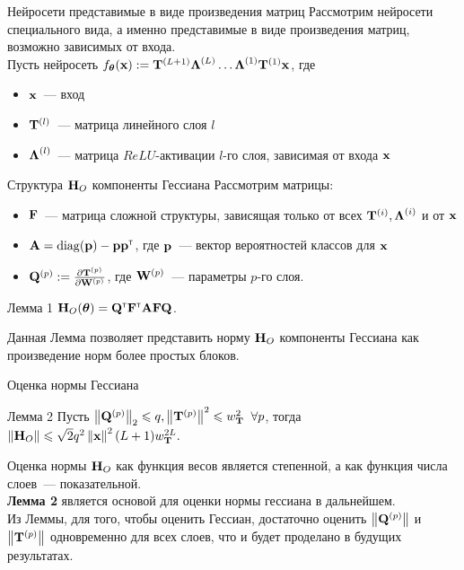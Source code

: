 \documentclass[aspectratio=169]{beamer}
\begin{document}
\begin{frame}{Нейросети представимые в виде произведения матриц}
Рассмотрим нейросети специального вида, а именно представимые в виде произведения матриц, возможно зависимых от входа. \\
        Пусть нейросеть $f_{\boldsymbol{\theta}}(\mathbf{x}) := \mathbf{T}^{(L+1)}\boldsymbol{\Lambda}^{(L)}\dots \boldsymbol{\Lambda}^{(1)}\mathbf{T}^{(1)}\mathbf{x}$, где 
        \vspace{-0.5em}
        \begin{itemize}
        \item $\mathbf{x}$~--- вход \item $\mathbf{T}^{(l)}$~--- матрица линейного слоя $l$
        \item $\boldsymbol{\Lambda}^{(l)}$~--- матрица $ReLU$-активации $l$-го слоя, зависимая от входа $\mathbf{x}$
        
        \end{itemize}
\end{frame}


\begin{frame}{Структура $\mathbf{H}_O$ компоненты Гессиана} 
\vspace{-0.5em}
Рассмотрим матрицы:
\begin{itemize}
\item $\mathbf{F}$~--- матрица сложной структуры, зависящая только от всех $\mathbf{T}^{(i)}, \boldsymbol{\Lambda}^{(i)}$ и от $\mathbf{x}$ 
\item $\mathbf{A} = \mathrm{diag}(\mathbf{p}) - \mathbf{p}\mathbf{p}^{\text{\tiny\sffamily\upshape\mdseries T}}$, где $\mathbf{p}$~--- вектор вероятностей классов для $\mathbf{x}$
\item $\mathbf{Q}^{(p)} := \frac{\partial \mathbf{T}^{(p)}}{\partial \mathbf{W}^{(p)}}$, где $\mathbf{W}^{(p)}$~--- параметры $p$-го слоя.
\vspace{-0.5em}
\end{itemize}
    \begin{block}{Лемма 1}
        $\mathbf{H}_O(\boldsymbol{\theta}) = \mathbf{Q}^{\text{\tiny\sffamily\upshape\mdseries T}}\mathbf{F}^{\text{\tiny\sffamily\upshape\mdseries T}}\mathbf{A}\mathbf{F}\mathbf{Q}$.
    \end{block}
    Данная Лемма позволяет представить норму $\mathbf{H}_O$ компоненты Гессиана как произведение норм более простых блоков.
\end{frame}

\begin{frame}{Оценка нормы Гессиана}
    \begin{block}{Лемма 2} 
    \vspace{-0.5em}
    Пусть $\left\|\mathbf{Q}^{(p)}\right\|_2 \leqslant q, \left\|\mathbf{T}^{(p)}\right\|^2 \leqslant w_{\mathbf{T}}^2\;\; \forall p$, тогда \\
    $\left\|\mathbf{H}_O\right\| \leqslant \sqrt{2}q^2\left\|\mathbf{x}\right\|^2(L+1)w_{\mathbf{T}}^{2L}.$
    \end{block}
    Оценка нормы $\mathbf{H}_O$ как функция весов является степенной, а как функция числа слоев~--- показательной. \\
    \textbf{Лемма 2} является основой для оценки нормы гессиана в дальнейшем. \\
    Из Леммы, для того, чтобы оценить Гессиан, достаточно оценить $\left\|\mathbf{Q}^{(p)}\right\|$ и $\left\|\mathbf{T}^{(p)}\right\|$ одновременно для всех слоев, что и будет проделано в будущих результатах.
    
\end{frame}
\end{document}
